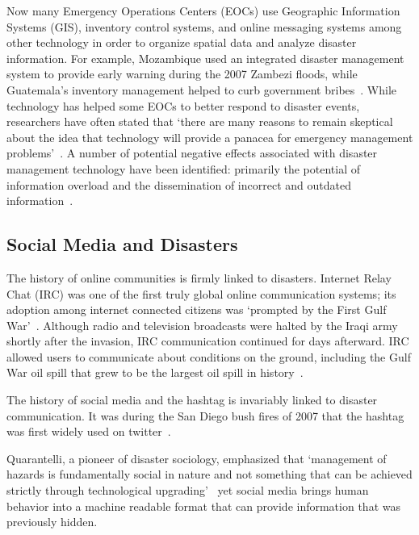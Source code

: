 Now many Emergency Operations Centers (EOCs) use Geographic Information Systems
(GIS), inventory control systems, and online messaging systems among other
technology in order to organize spatial data and analyze disaster information.
For example, Mozambique used an integrated disaster management system to provide
early warning during the 2007  Zambezi floods, while Guatemala's inventory
management helped to curb government bribes~\cite{aminDataNaturalDisasters2008}.
While technology has helped some EOCs to better respond to disaster events,
researchers have often stated that `there are many reasons to remain skeptical
about the idea that technology will provide a panacea for emergency management
problems'~\cite{tzemosUseGISFederal1995, tierneyFacingUnexpectedDisaster2001,
perryNaturalDisasterManagement2007}. A number of potential negative effects
associated with disaster management technology have been identified: primarily
the potential of information overload and the dissemination of incorrect and
outdated information~\cite{quarantelliProblematicalAspectsInformation1997,
flentgeDesigningContextAwareHCI}.

\subsection{Social Media and Disasters}\label{chap2:socialMedia}
The history of online communities is firmly linked to disasters. Internet
Relay Chat (IRC) was one of the first truly global online communication systems;
its adoption among internet connected citizens was `prompted by the First Gulf
War'~\cite{salazarHashtagsAnnotatedHistory2017}. Although radio and
television broadcasts were halted by the Iraqi army shortly after the invasion,
IRC communication continued for days afterward. IRC allowed users to communicate
about conditions on the ground, including the Gulf War oil spill that grew to be
the largest oil spill in history~\cite{Timeline20Years2010}.

The history of social media and the hashtag is invariably linked to disaster
communication.  It was during the San Diego bush fires of 2007 that the hashtag
was first widely used on twitter~\cite{salazarHashtagsAnnotatedHistory2017}.

Quarantelli, a pioneer of disaster sociology, emphasized that  `management of
hazards is fundamentally social in nature and not something that can be achieved
strictly through technological
upgrading'~\cite{tierneyFacingUnexpectedDisaster2001} yet social media brings
human behavior into a machine readable format that can provide
information that was previously hidden.

